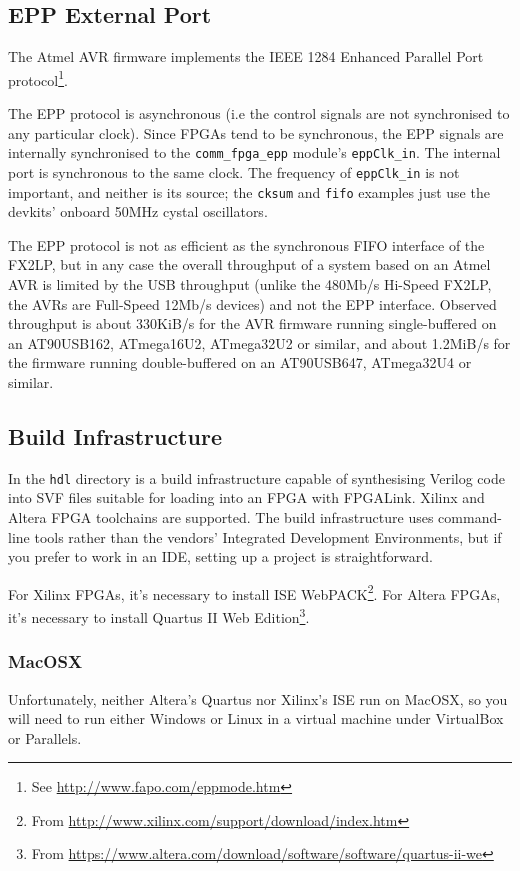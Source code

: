 \subsection{EPP External Port}
The Atmel AVR firmware implements the IEEE 1284 Enhanced Parallel Port protocol\footnote{See \url{http://www.fapo.com/eppmode.htm}}.


The EPP protocol is asynchronous (i.e the control signals are not synchronised to any particular clock). Since FPGAs tend to be synchronous, the EPP signals are internally synchronised to the \texttt{comm\_fpga\_epp} module's \texttt{eppClk\_in}. The internal port is synchronous to the same clock. The frequency of \texttt{eppClk\_in} is not important, and neither is its source; the \texttt{cksum} and \texttt{fifo} examples just use the devkits' onboard 50MHz cystal oscillators.

The EPP protocol is not as efficient as the synchronous FIFO interface of the FX2LP, but in any case the overall throughput of a system based on an Atmel AVR is limited by the USB throughput (unlike the 480Mb/s Hi-Speed FX2LP, the AVRs are Full-Speed 12Mb/s devices) and not the EPP interface. Observed throughput is about 330KiB/s for the AVR firmware running single-buffered on an AT90USB162, ATmega16U2, ATmega32U2 or similar, and about 1.2MiB/s for the firmware running double-buffered on an AT90USB647, ATmega32U4 or similar.

\subsection{Build Infrastructure}
In the \texttt{hdl} directory is a build infrastructure capable of synthesising Verilog code into SVF files suitable for loading into an FPGA with FPGALink. Xilinx and Altera FPGA toolchains are supported. The build infrastructure uses command-line tools rather than the vendors' Integrated Development Environments, but if you prefer to work in an IDE, setting up a project is straightforward.

For Xilinx FPGAs, it's necessary to install ISE WebPACK\footnote{From \url{http://www.xilinx.com/support/download/index.htm}}. For Altera FPGAs, it's necessary to install Quartus II Web Edition\footnote{From \url{https://www.altera.com/download/software/software/quartus-ii-we}}.

\subsubsection{MacOSX}
Unfortunately, neither Altera's Quartus nor Xilinx's ISE run on MacOSX, so you will need to run either Windows or Linux in a virtual machine under VirtualBox or Parallels.

